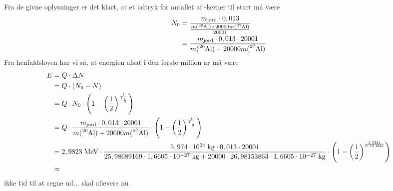 \documentclass{report}
\begin{document}
Fra de givne oplysninger er det klart, at et udtryk for antallet af -kerner til start må være
\begin{equation*}
\begin{split}
  N_0 &=\frac{m _{\text{jord} }\cdot 0,013}{\frac{m(\ce{^26Al} ) + 20000 m(\ce{^27Al} )}{20001}}\\
  &=\frac{m _{\text{jord} }\cdot 0,013 \cdot 20001}{m(\ce{^26Al} ) + 20000 m(\ce{^27Al} )}\\
\end{split}
\end{equation*}
Fra henfaldsloven har vi så, at energien afsat i den første million år må være
\begin{equation*}
\begin{split}
  E&=Q \cdot \Delta N\\
  &=Q \cdot \left(N_0-N\right) \\
  &=Q \cdot N_0 \cdot \left(1-\left(\frac{1}{2}\right) ^{\frac{t}{T _{\frac{1}{2}}}}\right) \\
  &=Q \cdot \frac{m _{\text{jord} }\cdot 0,013 \cdot 20001}{m(\ce{^26Al} ) + 20000 m(\ce{^27Al} )} \cdot \left(1-\left(\frac{1}{2}\right) ^{\frac{t}{T _{\frac{1}{2}}}}\right) \\
  &=2,9823 \;\unit{MeV} \cdot \frac{5,974 \cdot 10 ^{24} \;\unit{kg} \cdot 0,013 \cdot 20001}{25,98689169 \cdot 1,6605 \cdot 10 ^{-27}\;\unit{kg} + 20000 \cdot 26,98153863 \cdot 1,6605 \cdot 10 ^{-27}\;\unit{kg} } \cdot  \left(1-\left(\frac{1}{2}\right) ^{\frac{1 \;\unit{M} \text{år} }{0,72 \;\unit{M} \text{år} }}\right)  \\
  &\approx 
\end{split}
\end{equation*}
ikke tid til at regne ud... skal aflevere nu
\end{document}
